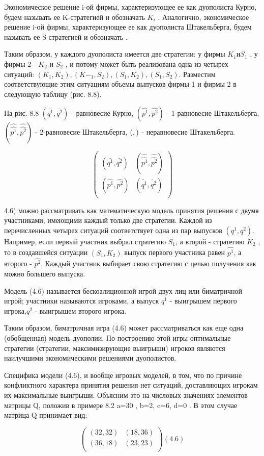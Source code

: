 \documentclass[12pt, 4paper]{book}
\begin{document}
{Экономическое решение i-ой фирмы, характеризующее ее как дуополиста Курно, будем называть ее K-стратегией и обозначать $K_i$ . Аналогично, экономическое решение i-ой фирмы, характеризующее ее как дуополиста Штакельберга, будем называть ее S-стратегией и обозначать  .
\par

Таким образом, у каждого дуополиста имеется две стратегии: у фирмы  $K_1 и S_1$ , у фирмы 2 - $K_2$ и $S_2$ , и потому может быть реализована одна из четырех ситуаций: $(K_1,K_2),(K-_1,S_2 ),(S_1,K_2),(S_1,S_2)$. Разместим соответствующие этим ситуациям объемы выпусков фирмы 1 и фирмы 2 в следующую таблицу (рис. 8.8).
\par

На рис. 8.8 $(\bar{q^1},\bar{q^2})$ - равновесие Курно, $(\hat{p^1},\hat{p^2})$ - 1-равновесие Штакельберга, $(\hat{\hat{p^1}},\hat{\hat{p^2}})$ - 2-равновесие Штакельберга, $(\title{p^1},\title{p^2})$ - неравновесие Штакельберга.
\begin{center}
\[
\begin{pmatrix} (\bar{q^1},\bar{q^2}) & (\hat{\hat{p^1}},\hat{\hat{p^2}}) \\ (\hat{p^1},\hat{p^2}) & (\tilde{q^1},\tilde{q^2})\\ \end{pmatrix}
\]
\end{center} 4.6)
можно рассматривать как математическую модель принятия решения с двумя участниками, имеющими каждый только две стратегии. Каждой из перечисленных четырех ситуаций соответствует одна из пар выпусков $(q^1,q^2)$. Например, если первый участник выбрал стратегию $S_1$, а второй - стратегию $K_2$ , то в создавшейся ситуации $(S_1,K_2)$ выпуск первого участника равен $\hat{p^1}$, а второго - $\hat{p^2}$. Каждый участник выбирает свою стратегию с целью получения как можно большего выпуска.
\par

Модель (4.6) называется бескоалиционной игрой двух лиц или биматричной игрой; участники называются игроками, а выпуск $q^1$ - выигрышем первого игрока,$q^2$  - выигрышем второго игрока.
\par

Таким образом, биматричная игра (4.6) может рассматриваться как еще одна (обобщенная) модель дуополии. По построению этой игры оптимальные стратегии (стратегии, максимизирующие выигрыши) игроков являются наилучшими экономическими решениями дуополистов.
\par

Специфика модели (4.6), и вообще игровых моделей, в том, что по причине конфликтного характера принятия решения нет ситуаций, доставляющих игрокам их максимальные выигрыши. Объясним это на числовых значениях элементов матрицы Q, положив в примере 8.2 a=30 , b=2, c=6, d=0 . В этом случае матрица Q принимает вид:
\begin{center}
\[
\begin{pmatrix} (32,32) & (18,36) \\ (36,18) & (23,23)\\ \end{pmatrix} (4.6)
\]
\end{center}
\par

}
\end{document}
